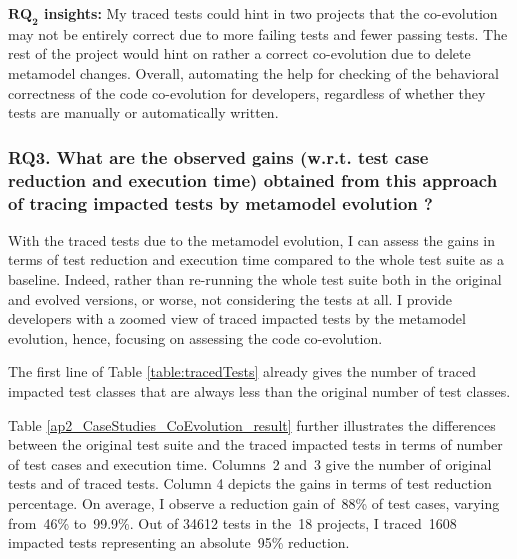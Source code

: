 \begin{table}[t]
{\begin{tabular}{
			@{\hskip3pt}c@{\hskip3pt}|c@{\hskip3pt}|c@{\hskip3pt}|c@{\hskip3pt}|c@{\hskip3pt}|c@{\hskip3pt}|c@{\hskip3pt}|c@{\hskip3pt}|| c@{\hskip3pt} |c@{\hskip3pt} }
		
		\bottomrule
	\end{tabular}
}
\end{table}

\begin{tcolorbox}[boxsep=-2pt]
\textbf{$\boldsymbol{RQ_2}$ insights:}
My traced tests could hint in two projects that the co-evolution may not be entirely correct due to more failing tests and fewer passing tests. The rest of the project would hint on rather a correct co-evolution due to delete metamodel changes. Overall, automating the help for checking of the behavioral correctness of the code co-evolution for developers, regardless of whether they tests are manually or automatically written.  
\end{tcolorbox}



\subsubsection{RQ3. What are the observed gains (w.r.t. test case reduction and execution time) obtained from this approach of tracing impacted tests by metamodel evolution ?}
With the traced tests due to the metamodel evolution, I can assess the gains in terms of test reduction and execution time compared to the whole test suite as a baseline. 
Indeed, rather than re-running the whole test suite both in the original and evolved versions, or worse, not considering the tests at all. I provide developers with a zoomed view of traced impacted tests by the metamodel evolution, hence, focusing on assessing the code co-evolution.  

The first line of Table \ref{table:tracedTests} already gives the number of traced impacted test classes that are always less than the original number of test classes. 

Table \ref{ap2_CaseStudies_CoEvolution_result} further illustrates the differences between the original test suite and the traced impacted tests in terms of number of test cases and execution time. Columns~2 and~3 give the number of original tests and of traced tests.
%
Column 4 depicts the gains in terms of test reduction percentage. On average, I observe a reduction gain of~88\% of test cases, varying from~46\% to~99.9\%. Out of 34612 tests in the~18 projects, I traced~1608 impacted tests representing an absolute~95\% reduction.

